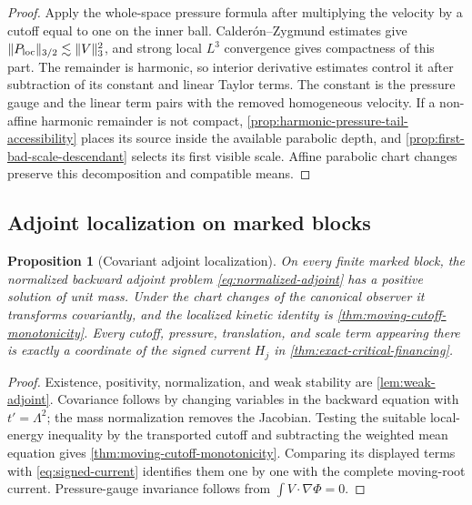 \documentclass[11pt]{amsart}
\numberwithin{equation}{section}
\theoremstyle{plain}
\newtheorem{proposition}[proposition]{Proposition}
\theoremstyle{definition}
\theoremstyle{remark}
\begin{document}
\begin{proof}
Apply the whole-space pressure formula after multiplying the velocity by a
cutoff equal to one on the inner ball.  Calder\'on--Zygmund estimates give
\(\|P_{\rm loc}\|_{3/2}\lesssim\|V\|_3^2\), and strong local \(L^3\)
convergence gives compactness of this part.  The remainder is harmonic, so
interior derivative estimates control it after subtraction of its constant
and linear Taylor terms.  The constant is the pressure gauge and the linear
term pairs with the removed homogeneous velocity.  If a non-affine harmonic
remainder is not compact, \cref{prop:harmonic-pressure-tail-accessibility}
places its source inside the available parabolic depth, and
\cref{prop:first-bad-scale-descendant} selects its first visible scale.
Affine parabolic chart changes preserve this decomposition and compatible
means.
\end{proof}

\subsection{Adjoint localization on marked blocks}
\label{app:normalized-adjoint-solutions}

\begin{proposition}[Covariant adjoint localization]
\label{prop:covariant-adjoint-localization}
On every finite marked block, the normalized backward adjoint problem
\eqref{eq:normalized-adjoint} has a positive solution of unit mass.
Under the chart changes of the canonical observer it transforms covariantly,
and the localized kinetic identity is
\cref{thm:moving-cutoff-monotonicity}.  Every cutoff, pressure, translation,
and scale term appearing there is exactly a coordinate of the signed current
\(H_j\) in \cref{thm:exact-critical-financing}.
\end{proposition}

\begin{proof}
Existence, positivity, normalization, and weak stability are
\cref{lem:weak-adjoint}.  Covariance follows by changing variables in the
backward equation with \(t'=\Lambda^2\); the mass normalization removes the
Jacobian.  Testing the suitable local-energy inequality by the transported
cutoff and subtracting the weighted mean equation gives
\cref{thm:moving-cutoff-monotonicity}.  Comparing its displayed terms with
\eqref{eq:signed-current} identifies them one by one with the complete
moving-root current.  Pressure-gauge invariance follows from
\(\int V\cdot\nabla\Phi=0\).
\end{proof}
\end{document}
